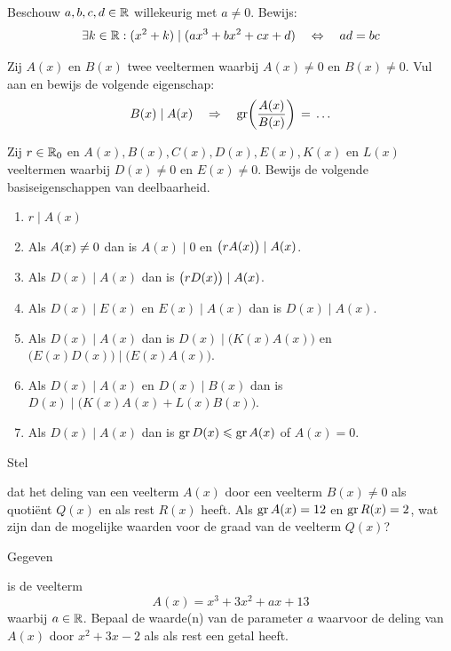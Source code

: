 \documentclass{ximera}
\begin{document}
\begin{Oefening}
Beschouw $a,b,c,d \in \mathbb{R}$ willekeurig met $a \neq 0$. Bewijs:
\[
\exists k \in \mathbb{R}: (x^2 + k) \mid (ax^3 + bx^2 + cx + d) \quad \Leftrightarrow \quad ad = bc
\]
\end{Oefening}

\begin{Uitbreiding}
\begin{Oefening} 
Zij $A(x)$ en $B(x)$ twee veeltermen waarbij $A(x) \neq 0$ en $B(x) \neq 0$. Vul aan en bewijs de volgende eigenschap:
\[
B(x) \mid A(x) \quad \Rightarrow \quad \operatorname{gr}\biggl(\frac{A(x)}{B(x)}\biggr) 
\, = \, \ldots
\]
\end{Oefening}

\begin{Oefening}
Zij $r \in \mathbb{R}_0$ en $A(x), B(x), C(x), D(x), E(x), K(x)$ en $L(x)$ veeltermen waarbij $D(x) \neq 0$ en $E(x) \neq 0$. Bewijs de volgende basiseigenschappen van deelbaarheid. 
\begin{enumerate}
\item
$r \mid A(x)$
\item
Als $\displaystyle A(x)  \neq 0$ dan is $A(x) \mid 0$ en $\displaystyle \bigl(rA(x)\bigr) \mid A(x)$.
\item
Als $D(x) \mid A(x)$ dan is $\displaystyle \bigl(rD(x)\bigr) \mid A(x)$.
\item
Als $D(x) \mid E(x)$ en $E(x) \mid A(x)$ dan is $D(x) \mid A(x)$. 
\item
Als $D(x) \mid A(x)$ dan is $D(x) \mid \bigl(K(x)A(x)\bigr)$ en $\bigl(E(x)D(x)\bigr) \mid \bigl(E(x)A(x)\bigr)$.
\item
Als $D(x) \mid A(x)$ en $D(x) \mid B(x)$ dan is $D(x) \mid \bigl(K(x)A(x)+L(x)B(x)\bigr)$.
\item
Als $D(x) \mid A(x)$ dan is $\operatorname{gr} D(x) \leqslant \operatorname{gr} A(x)$ of $A(x) = 0$.
\end{enumerate}
\end{Oefening}
\end{Uitbreiding}

\begin{Oefening}\setcounter{enumi}{17}  
\hypertarget{oef2.17}{Stel} dat het deling van een veelterm $A(x)$ door een veelterm $B(x) \neq 0$ als quoti\"ent $Q(x)$ en als rest $R(x)$ heeft. Als $\operatorname{gr} A(x) = 12$ en $\operatorname{gr} R(x) = 2$, wat zijn dan de mogelijke waarden voor de graad van de veelterm $Q(x)$?
\end{Oefening}

\begin{Oefening}\setcounter{enumi}{18} 
\hypertarget{oef2.18}{Gegeven} is de veelterm
\[
A(x) = x^3+3x^2+ax+13
\]
waarbij $a \in \mathbb{R}$. Bepaal de waarde(n) van de parameter $a$ waarvoor de deling van $A(x)$ door $x^2+3x-2$ als als rest een getal heeft. 
\end{Oefening}
\end{document}
